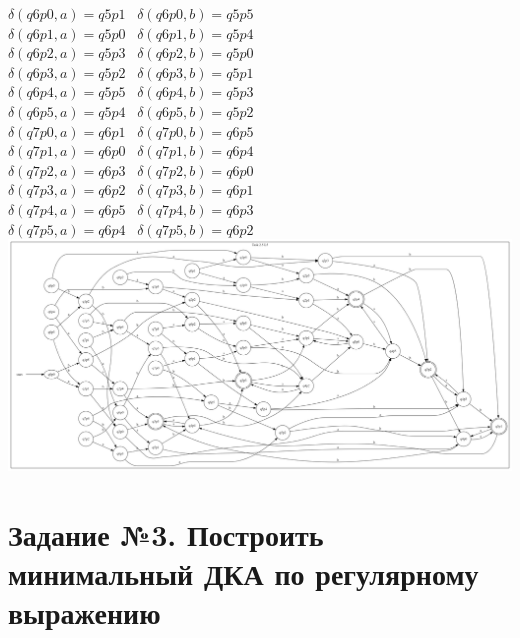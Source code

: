\documentclass{article}
\begin{document}
\noindent$\delta(q6p0, a) = q5p1$ \  $\delta(q6p0, b) = q5p5$ \\
$\delta(q6p1, a) = q5p0$ \  $\delta(q6p1, b) = q5p4$ \\
$\delta(q6p2, a) = q5p3$ \  $\delta(q6p2, b) = q5p0$ \\
$\delta(q6p3, a) = q5p2$ \  $\delta(q6p3, b) = q5p1$ \\
$\delta(q6p4, a) = q5p5$ \  $\delta(q6p4, b) = q5p3$ \\
$\delta(q6p5, a) = q5p4$ \  $\delta(q6p5, b) = q5p2$ \\

\noindent$\delta(q7p0, a) = q6p1$ \  $\delta(q7p0, b) = q6p5$ \\
$\delta(q7p1, a) = q6p0$ \  $\delta(q7p1, b) = q6p4$ \\
$\delta(q7p2, a) = q6p3$ \  $\delta(q7p2, b) = q6p0$ \\
$\delta(q7p3, a) = q6p2$ \  $\delta(q7p3, b) = q6p1$ \\
$\delta(q7p4, a) = q6p5$ \  $\delta(q7p4, b) = q6p3$ \\
$\delta(q7p5, a) = q6p4$ \  $\delta(q7p5, b) = q6p2$ \\

\newpage\includegraphics[scale=0.18]{2_5_3.png}


\newpage\section{Задание №3. Построить минимальный ДКА по регулярному выражению}
\end{document}
